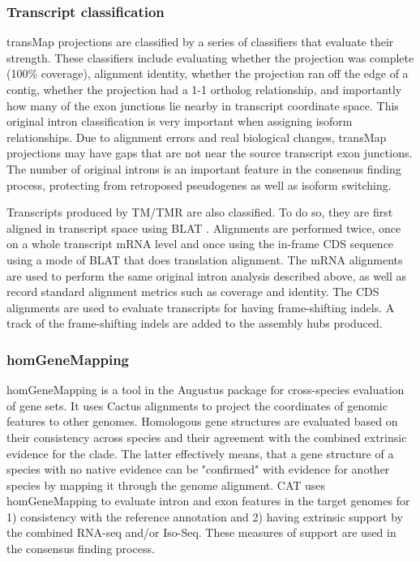 \documentclass[fleqn,10pt]{wlscirep}
\begin{document}
\subsubsection*{Transcript classification}
	transMap projections are classified by a series of classifiers that evaluate their strength. These classifiers include evaluating whether the projection was complete (100\% coverage), alignment identity, whether the projection ran off the edge of a contig, whether the projection had a 1-1 ortholog relationship, and importantly how many of the exon junctions lie nearby in transcript coordinate space. This original intron classification is very important when assigning isoform relationships. Due to alignment errors and real biological changes, transMap projections may have gaps that are not near the source transcript exon junctions. The number of original introns is an important feature in the consensus finding process, protecting from retroposed pseudogenes as well as isoform switching.
  
	Transcripts produced by TM/TMR are also classified. To do so, they are first aligned in transcript space using BLAT \cite{kent2002blat}. Alignments are performed twice, once on a whole transcript mRNA level and once using the in-frame CDS sequence using a mode of BLAT that does translation alignment. The mRNA alignments are used to perform the same original intron analysis described above, as well as record standard alignment metrics such as coverage and identity. The CDS alignments are used to evaluate transcripts for having frame-shifting indels. A track of the frame-shifting indels are added to the assembly hubs produced.

\subsubsection*{homGeneMapping}
	homGeneMapping is a tool in the Augustus package for cross-species evaluation of gene sets. It uses Cactus alignments to project the coordinates of genomic features to other genomes. Homologous gene structures are evaluated based on their consistency across species and their agreement with the combined extrinsic evidence for the clade. The latter effectively means, that a gene structure of a species with no native evidence can be "confirmed" with evidence for another species by mapping it through the genome alignment. CAT uses homGeneMapping to evaluate intron and exon features in the target genomes for 1) consistency with the reference annotation and 2) having extrinsic support by the combined RNA-seq and/or Iso-Seq. These measures of support are used in the consensus finding process.
\end{document}
